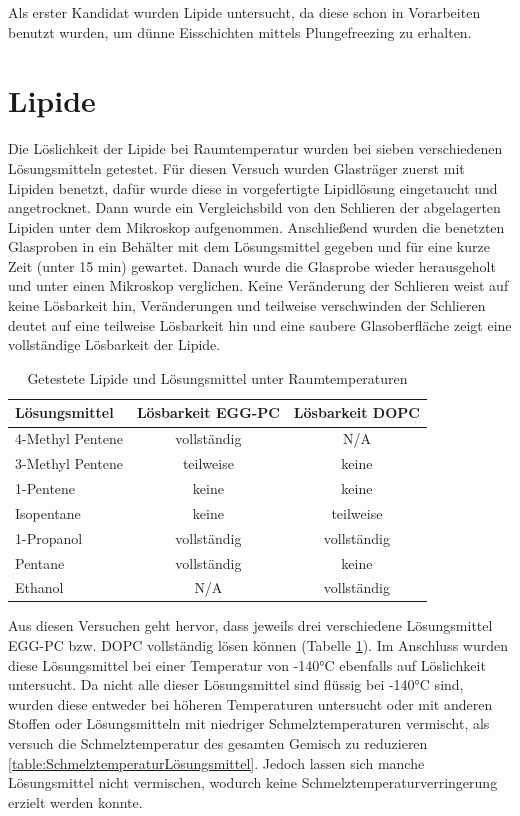 Als erster Kandidat wurden Lipide untersucht, da diese schon in Vorarbeiten benutzt wurden, um dünne Eisschichten mittels Plungefreezing zu erhalten.

\section{Lipide}

Die Löslichkeit der Lipide bei Raumtemperatur wurden bei sieben verschiedenen Lösungsmitteln getestet. Für diesen Versuch wurden Glasträger zuerst mit Lipiden benetzt, dafür wurde diese in vorgefertigte Lipidlösung eingetaucht und angetrocknet. Dann wurde ein Vergleichsbild von den Schlieren der abgelagerten Lipiden unter dem Mikroskop aufgenommen. Anschließend wurden die benetzten Glasproben in ein Behälter mit dem Lösungsmittel gegeben und für eine kurze Zeit (unter 15 min) gewartet. Danach wurde die Glasprobe wieder herausgeholt und unter einen Mikroskop verglichen. Keine Veränderung der Schlieren weist auf keine Lösbarkeit hin, Veränderungen und teilweise verschwinden der Schlieren deutet auf eine teilweise Lösbarkeit hin und eine saubere Glasoberfläche zeigt eine vollständige Lösbarkeit der Lipide.

\begin{table}[h]
	\centering
	\begin{tabular}{|l|c|c|}
		\hline
		Lösungsmittel & Lösbarkeit EGG-PC & Lösbarkeit DOPC \\
		\hline
		\hline
		4-Methyl Pentene & vollständig & N/A  \\ 
		\hline
		3-Methyl Pentene & teilweise & keine \\
		\hline
		1-Pentene & keine & keine \\
		\hline
		Isopentane & keine & teilweise\\
		\hline
		1-Propanol & vollständig & vollständig\\
		\hline
		Pentane & vollständig & keine\\
		\hline
		Ethanol & N/A & vollständig\\
		\hline
	\end{tabular}
	\caption{Getestete Lipide und Lösungsmittel unter Raumtemperaturen}
	\label{table:LoeslichkeitRaumtemperatur}
\end{table}

Aus diesen Versuchen geht hervor, dass jeweils drei verschiedene Lösungsmittel EGG-PC bzw. DOPC vollständig lösen können (Tabelle \ref{table:LoeslichkeitRaumtemperatur}). Im Anschluss wurden diese Lösungsmittel bei einer Temperatur von -140°C ebenfalls auf Löslichkeit untersucht. Da nicht alle dieser Lösungsmittel sind flüssig bei -140°C sind, wurden diese entweder bei höheren Temperaturen untersucht oder mit anderen Stoffen oder Lösungsmitteln mit niedriger Schmelztemperaturen vermischt, als versuch die Schmelztemperatur des gesamten Gemisch zu reduzieren \ref{table:SchmelztemperaturLösungsmittel}. Jedoch lassen sich manche Lösungsmittel nicht vermischen, wodurch keine Schmelztemperaturverringerung erzielt werden konnte. 

